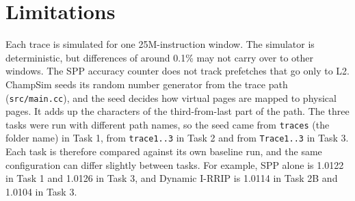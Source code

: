 \documentclass[10pt]{article}
\begin{document}
\section*{Limitations}
Each trace is simulated for one 25M-instruction window. The simulator is deterministic, but differences of around 0.1\% may not carry over to other windows. The SPP accuracy counter does not track prefetches that go only to L2. ChampSim seeds its random number generator from the trace path (\texttt{src/main.cc}), and the seed decides how virtual pages are mapped to physical pages. It adds up the characters of the third-from-last part of the path. The three tasks were run with different path names, so the seed came from \texttt{traces} (the folder name) in Task 1, from \texttt{trace1..3} in Task 2 and from \texttt{Trace1..3} in Task 3. Each task is therefore compared against its own baseline run, and the same configuration can differ slightly between tasks. For example, SPP alone is 1.0122 in Task 1 and 1.0126 in Task 3, and Dynamic I-RRIP is 1.0114 in Task 2B and 1.0104 in Task 3.
\end{document}
